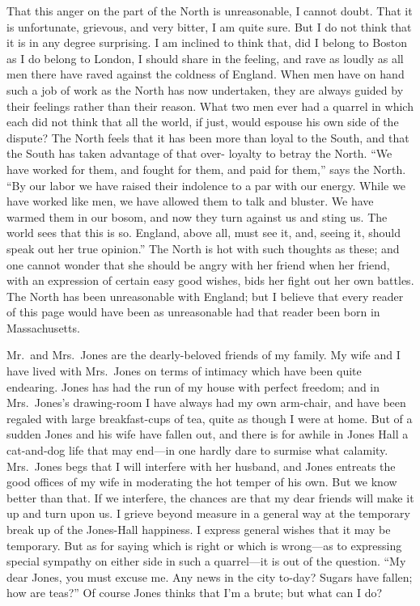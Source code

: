 That this anger on the part of the North is unreasonable, I cannot
doubt.  That it is unfortunate, grievous, and very bitter, I am
quite sure.  But I do not think that it is in any degree
surprising.  I am inclined to think that, did I belong to Boston as
I do belong to London, I should share in the feeling, and rave as
loudly as all men there have raved against the coldness of England.
When men have on hand such a job of work as the North has now
undertaken, they are always guided by their feelings rather than
their reason.  What two men ever had a quarrel in which each did
not think that all the world, if just, would espouse his own side
of the dispute?  The North feels that it has been more than loyal
to the South, and that the South has taken advantage of that over-
loyalty to betray the North.  ``We have worked for them, and fought
for them, and paid for them,'' says the North.  ``By our labor we
have raised their indolence to a par with our energy.  While we
have worked like men, we have allowed them to talk and bluster.  We
have warmed them in our bosom, and now they turn against us and
sting us.  The world sees that this is so.  England, above all,
must see it, and, seeing it, should speak out her true opinion.''
The North is hot with such thoughts as these; and one cannot wonder
that she should be angry with her friend when her friend, with an
expression of certain easy good wishes, bids her fight out her own
battles.  The North has been unreasonable with England; but I
believe that every reader of this page would have been as
unreasonable had that reader been born in Massachusetts.

Mr.\ and Mrs.\ Jones are the dearly-beloved friends of my family.  My
wife and I have lived with Mrs.\ Jones on terms of intimacy which
have been quite endearing.  Jones has had the run of my house with
perfect freedom; and in Mrs.\ Jones's drawing-room I have always had
my own arm-chair, and have been regaled with large breakfast-cups
of tea, quite as though I were at home.  But of a sudden Jones and
his wife have fallen out, and there is for awhile in Jones Hall a
cat-and-dog life that may end---in one hardly dare to surmise what
calamity.  Mrs.\ Jones begs that I will interfere with her husband,
and Jones entreats the good offices of my wife in moderating the
hot temper of his own.  But we know better than that.  If we
interfere, the chances are that my dear friends will make it up and
turn upon us.  I grieve beyond measure in a general way at the
temporary break up of the Jones-Hall happiness.  I express general
wishes that it may be temporary.  But as for saying which is right
or which is wrong---as to expressing special sympathy on either side
in such a quarrel---it is out of the question.  ``My dear Jones, you
must excuse me.  Any news in the city to-day?  Sugars have fallen;
how are teas?''  Of course Jones thinks that I'm a brute; but what
can I do?

